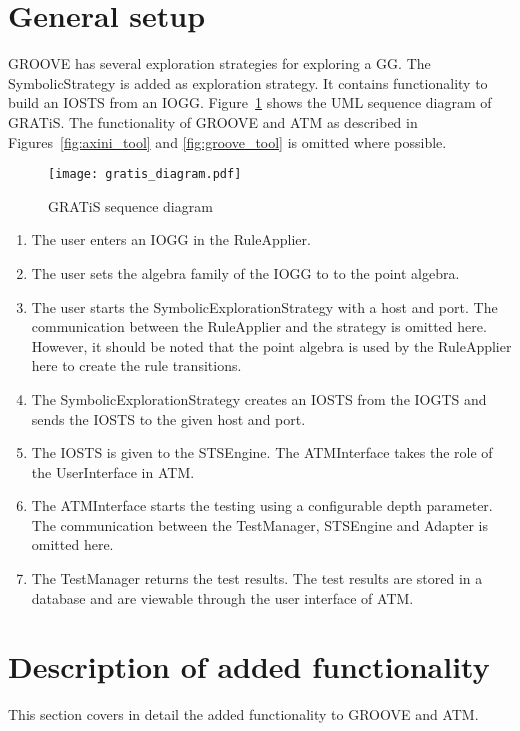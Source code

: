 \section{General setup}\label{sec:general-setup}
GROOVE has several exploration strategies for exploring a GG. The SymbolicStrategy is added as exploration strategy. It contains functionality to build an IOSTS from an IOGG. Figure~\ref{fig:tooling} shows the UML sequence diagram of GRATiS. The functionality of GROOVE and ATM as described in Figures~\ref{fig:axini_tool} and \ref{fig:groove_tool} is omitted where possible.

\begin{figure}[ht]
  \begin{center}
    \texttt{[image: gratis\_diagram.pdf]}
  \end{center}
  \caption{GRATiS sequence diagram}
  \label{fig:tooling}
\end{figure}

\begin{enumerate}
\item The user enters an IOGG in the RuleApplier.
\item The user sets the algebra family of the IOGG to to the point algebra. 
\item The user starts the SymbolicExplorationStrategy with a host and port. The communication between the RuleApplier and the strategy is omitted here. However, it should be noted that the point algebra is used by the RuleApplier here to create the rule transitions.
\item The SymbolicExplorationStrategy creates an IOSTS from the IOGTS and sends the IOSTS to the given host and port.
\item The IOSTS is given to the STSEngine. The ATMInterface takes the role of the UserInterface in ATM.
\item The ATMInterface starts the testing using a configurable depth parameter. The communication between the TestManager, STSEngine and Adapter is omitted here.
\item The TestManager returns the test results. The test results are stored in a database and are viewable through the user interface of ATM.
\end{enumerate}

\section{Description of added functionality}
This section covers in detail the added functionality to GROOVE and ATM. 

